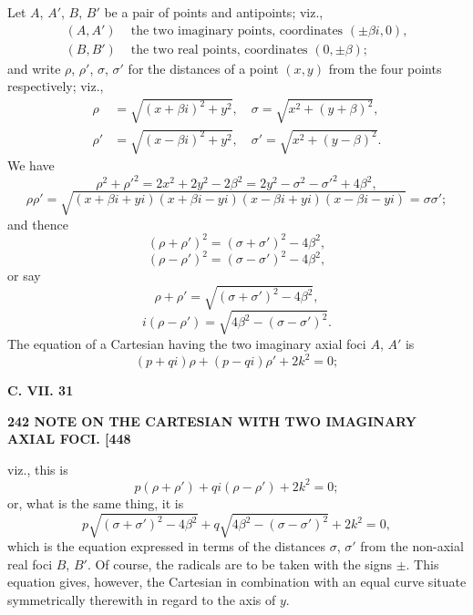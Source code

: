 \documentclass[11pt]{article}
\begin{document}
\medskip

Let $A$, $A'$, $B$, $B'$ be a pair of points and antipoints; viz.,
\begin{align*}
(A, A') &\text{ the two imaginary points, coordinates } (\pm \beta i, 0),\\
(B, B') &\text{ the two real points, coordinates } (0, \pm \beta);
\end{align*}
and write $\rho$, $\rho'$, $\sigma$, $\sigma'$ for the distances of a point $(x, y)$ from the four points respectively; viz.,
\begin{align*}
\rho &= \sqrt{(x + \beta i)^2 + y^2}, \quad \sigma = \sqrt{x^2 + (y + \beta)^2},\\
\rho' &= \sqrt{(x - \beta i)^2 + y^2}, \quad \sigma' = \sqrt{x^2 + (y - \beta)^2}.
\end{align*}
We have
\[ \rho^2 + \rho'^2 = 2x^2 + 2y^2 - 2\beta^2 = 2y^2 - \sigma^2 - \sigma'^2 + 4\beta^2, \]
\[ \rho\rho' = \sqrt{(x + \beta i + yi)(x + \beta i - yi)(x - \beta i + yi)(x - \beta i - yi)} = \sigma\sigma'; \]
and thence
\[ (\rho + \rho')^2 = (\sigma + \sigma')^2 - 4\beta^2, \]
\[ (\rho - \rho')^2 = (\sigma - \sigma')^2 - 4\beta^2, \]
or say
\[ \rho + \rho' = \sqrt{(\sigma + \sigma')^2 - 4\beta^2}, \]
\[ i(\rho - \rho') = \sqrt{4\beta^2 - (\sigma - \sigma')^2}. \]
The equation of a Cartesian having the two imaginary axial foci $A$, $A'$ is
\[ (p + qi)\rho + (p - qi)\rho' + 2k^2 = 0; \]

\medskip
\noindent\textbf{C. VII. \hfill 31}

\medskip
\noindent\textbf{242 \hfill NOTE ON THE CARTESIAN WITH TWO IMAGINARY AXIAL FOCI. \hfill [448}

\medskip

viz., this is
\[ p(\rho + \rho') + qi(\rho - \rho') + 2k^2 = 0; \]
or, what is the same thing, it is
\[ p\sqrt{(\sigma + \sigma')^2 - 4\beta^2} + q\sqrt{4\beta^2 - (\sigma - \sigma')^2} + 2k^2 = 0, \]
which is the equation expressed in terms of the distances $\sigma$, $\sigma'$ from the non-axial
real foci $B$, $B'$. Of course, the radicals are to be taken with the signs $\pm$. This
equation gives, however, the Cartesian in combination with an equal curve situate
symmetrically therewith in regard to the axis of $y$.
\end{document}
